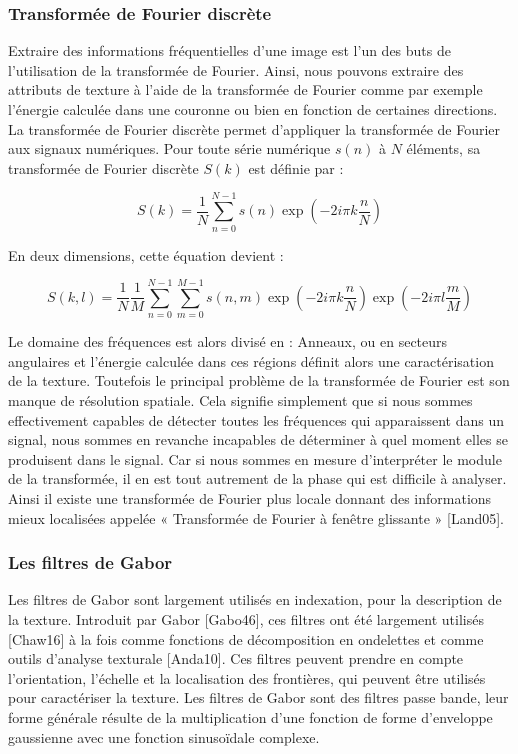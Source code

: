 \subsubsection{Transformée de Fourier discrète}
Extraire des informations fréquentielles d’une image est l’un des buts de l’utilisation de la
transformée de Fourier. Ainsi, nous pouvons extraire des attributs de texture à l’aide de la
transformée de Fourier comme par exemple l’énergie calculée dans une couronne ou bien en
fonction de certaines directions.\\

La transformée de Fourier discrète permet d’appliquer la transformée de Fourier aux signaux
numériques. Pour toute série numérique $s(n)$ à $N$ éléments, sa transformée de Fourier discrète
$S(k)$ est définie par :

\begin{equation}
	S(k) = \frac{1}{N} \sum_{n=0}^{N-1} s(n) \exp(-2i\pi k\frac{n}{N})
\end{equation}

En deux dimensions, cette équation devient :

\begin{equation}
S(k, l) = \frac{1}{N}\frac{1}{M} \sum_{n=0}^{N-1} \sum_{m=0}^{M-1} s(n, m) \exp(-2i\pi k\frac{n}{N}) \exp(-2i\pi l\frac{m}{M})
\end{equation}

Le domaine des fréquences est alors divisé en : Anneaux, ou en secteurs angulaires et l’énergie calculée dans ces régions définit alors une caractérisation de la texture. Toutefois le principal problème de la transformée de Fourier est son manque de résolution spatiale. Cela signifie simplement que si nous sommes effectivement capables de détecter toutes les fréquences qui apparaissent dans un signal, nous sommes en revanche incapables de déterminer à quel moment elles se produisent dans le signal. Car si nous sommes en mesure d’interpréter le module de la transformée, il en est tout autrement de la phase qui est difficile à analyser. Ainsi il existe une transformée de Fourier plus locale donnant des informations mieux localisées appelée « Transformée de Fourier à fenêtre glissante » [Land05].

\subsubsection{Les filtres de Gabor}

Les filtres de Gabor sont largement utilisés en indexation, pour la description de la texture.
Introduit par Gabor [Gabo46], ces filtres ont été largement utilisés [Chaw16] à la fois comme fonctions de décomposition en ondelettes et comme outils d'analyse texturale [Anda10]. Ces filtres peuvent prendre en compte l'orientation, l'échelle et la localisation des frontières, qui peuvent être utilisés pour caractériser la texture. Les filtres de Gabor sont des filtres passe bande, leur forme générale résulte de la multiplication d’une fonction de forme d'enveloppe gaussienne avec une fonction sinusoïdale complexe.\\

